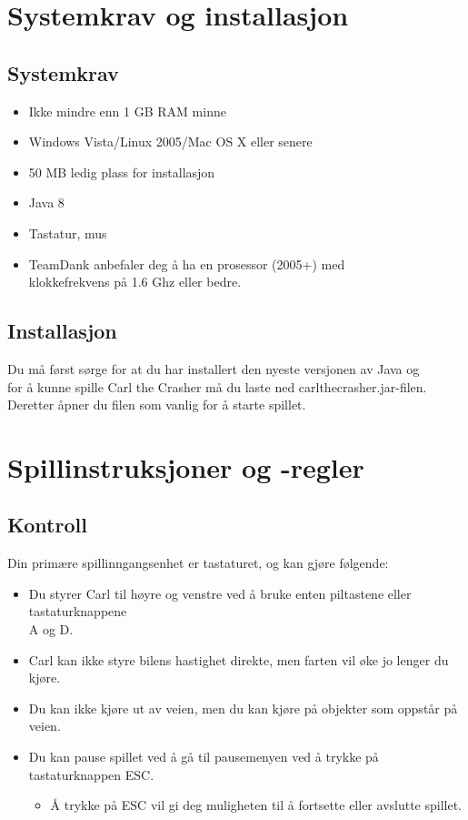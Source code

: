 \documentclass[paper=a4]{article}
\begin{document}
\section{Systemkrav og installasjon}
\subsection{Systemkrav}
\begin{itemize}
	\item Ikke mindre enn 1 GB RAM minne\\
	\item Windows Vista/Linux 2005/Mac OS X eller senere \\
	\item 50 MB ledig plass for installasjon \\
	\item Java 8 \\
	\item Tastatur, mus \\
 	\item TeamDank anbefaler deg å ha en prosessor (2005+) med \\ 
klokkefrekvens på 1.6 Ghz eller bedre.
\end{itemize}
\subsection{Installasjon}
Du må først sørge for at du har installert den nyeste versjonen av Java og \\
for å kunne spille Carl the Crasher må du laste ned carlthecrasher.jar-filen. \\
Deretter åpner du filen som vanlig for å starte spillet.   
\newpage

\section{Spillinstruksjoner og -regler} 
\subsection{Kontroll} 
Din primære spillinngangsenhet er tastaturet, og kan gjøre følgende: 
\begin{itemize}
	\item Du styrer Carl til høyre og venstre ved å bruke enten piltastene eller tastaturknappene \\ A og D. 
	\item Carl kan ikke styre bilens hastighet direkte, men farten vil øke jo lenger du kjøre.
	\item Du kan ikke kjøre ut av veien, men du kan kjøre på objekter som oppstår på veien.
	\item Du kan pause spillet ved å gå til pausemenyen ved å trykke på tastaturknappen ESC. 
	\begin{itemize}
		\item Å trykke på ESC vil gi deg muligheten til å fortsette eller avslutte spillet.
	\end{itemize}
\end{itemize}
\end{document}
